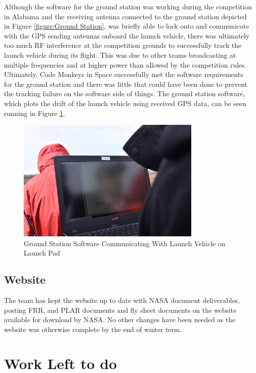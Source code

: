 \documentclass[onecolumn, draftclsnofoot, 10pt, compsoc]{IEEEtran}
\begin{document}
Although the software for the ground station was working during the competition in Alabama and the receiving antenna connected to the ground station depicted in Figure \ref{figure:Ground Station}, was briefly able to lock onto and communicate with the GPS sending antennas onboard the launch vehicle, there was ultimately too much RF interference at the competition grounds to successfully track the launch vehicle during its flight. This was due to other teams broadcasting at multiple frequencies and at higher power than allowed by the competition rules. Ultimately, Code Monkeys in Space successfully met the software requirements for the ground station and there was little that could have been done to prevent the tracking failure on the software side of things. The ground station software, which plots the drift of the launch vehicle using received GPS data, can be seen running in Figure \ref{figure:Ground Station 2}.

\begin{figure}[H]
	\centering
	\includegraphics[width=0.8\textwidth]{ground_station_2.JPG}
	\caption{Ground Station Software Communicating With Launch Vehicle on Launch Pad}
    \label{figure:Ground Station 2}
\end{figure}

\subsection{Website}
The team has kept the website up to date with NASA document deliverables, posting FRR, and PLAR documents and fly sheet documents on the website available for download by NASA. No other changes have been needed as the website was otherwise complete by the end of winter term.

\section{Work Left to do}
\end{document}
